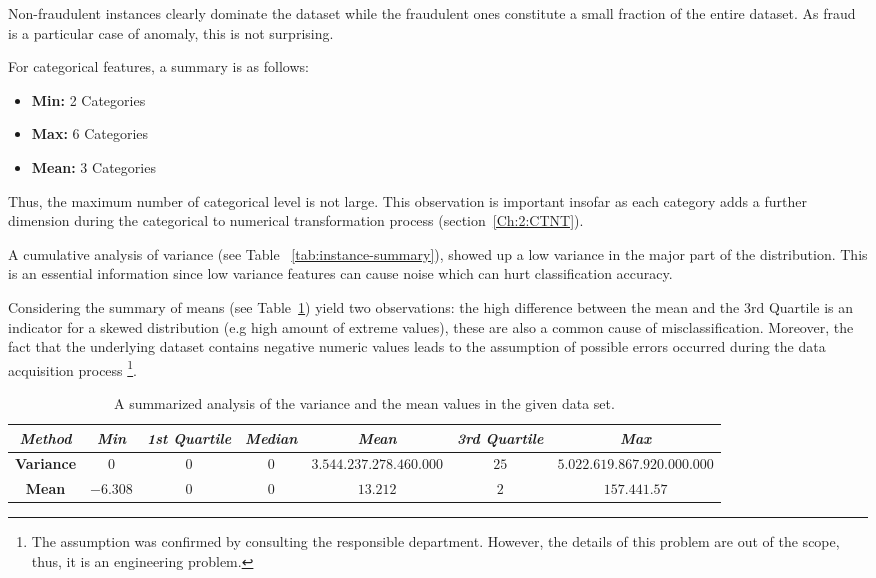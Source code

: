 Non-fraudulent instances clearly dominate the dataset while the fraudulent ones constitute a small fraction of the entire dataset. As fraud is a particular case of anomaly, this is not surprising.

For categorical features, a summary is as follows: 
\begin{itemize}
    \item \textbf{Min: } 2 Categories
    \item \textbf{Max: } 6 Categories
    \item \textbf{Mean:} 3 Categories
\end{itemize}

Thus, the maximum number of categorical level is not large.
This observation is important insofar as each category adds a further dimension during the categorical to numerical transformation process (section~\ref{Ch:2:CTNT}).

A cumulative analysis of variance (see Table~ \ref{tab:instance-summary}), showed up a low variance in the major part of the distribution. This is an essential information since low variance features can cause noise which can hurt classification accuracy. 

Considering the summary of means (see Table~\ref{tab:summarized-analysis}) yield two observations: the high difference between the mean and the 3rd Quartile is an indicator for a skewed distribution (e.g high amount of extreme values), these are also a common cause of  misclassification. Moreover, the fact that the underlying  dataset contains negative numeric values leads to the assumption of possible errors occurred during the data acquisition process \footnote{The assumption was confirmed by consulting the responsible department. However, the details of this problem are out of the scope, thus, it is an engineering problem.}.

\begin{table}[h!]
  \begin{center}
    \caption{A summarized analysis of the variance and the mean values in the given data set.}
    \label{tab:summarized-analysis}
    \hspace*{-2cm}\begin{tabular}{|c|c|c|c|c|c|c|}  \hline
    \textit{Method} & \textit{Min} & \textit{1st Quartile} & \textit{Median} & \textit{Mean} & \textit{3rd Quartile} & \textit{Max}  \\
      \hline
    \textbf{Variance} & \(0\) & \(0\) & \(0\) & \(3.544.237.278.460.000\) & \(25\) & \(5.022.619.867.920.000.000\) \\
     \hline
     \textbf{Mean} & \(-6.308\) & \(0\) & \(0\) & \(13.212\) & \(2\) & \(157.441.57\) \\
    \hline 
    \end{tabular}
  \end{center}
\end{table}



